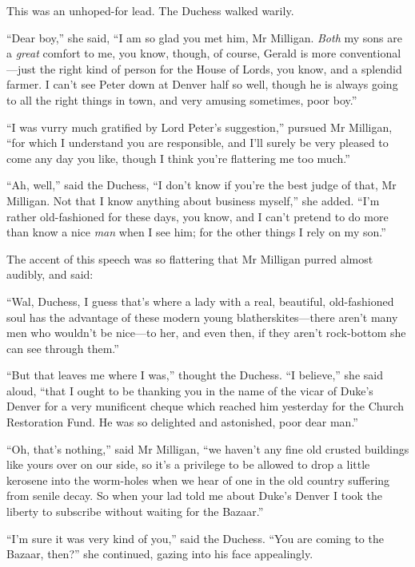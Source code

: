 This was an unhoped-for lead. The Duchess walked warily.

\enquote{Dear boy,} she said, \enquote{I am so glad you met him, Mr Milligan. \textit{Both} my sons are a \textit{great} comfort to me, you know, though, of course, Gerald is more conventional\allowbreak---\allowbreak just the right kind of person for the House of Lords, you know, and a splendid farmer. I can’t see Peter down at Denver half so well, though he is always going to all the right things in town, and very amusing sometimes, poor boy.}

\enquote{I was vurry much gratified by Lord Peter’s suggestion,} pursued Mr Milligan, \enquote{for which I understand you are responsible, and I’ll surely be very pleased to come any day you like, though I think you’re flattering me too much.}

\enquote{Ah, well,} said the Duchess, \enquote{I don’t know if you’re the best judge of that, Mr Milligan. Not that I know anything about business myself,} she added. \enquote{I’m rather old-fashioned for these days, you know, and I can’t pretend to do more than know a nice \textit{man} when I see him; for the other things I rely on my son.}

The accent of this speech was so flattering that Mr Milligan purred almost audibly, and said:

\enquote{Wal, Duchess, I guess that’s where a lady with a real, beautiful, old-fashioned soul has the advantage of these modern young blatherskites\allowbreak---\allowbreak there aren’t many men who wouldn’t be nice\allowbreak---\allowbreak to her, and even then, if they aren’t rock-bottom she can see through them.}

\enquote{But that leaves me where I was,} thought the Duchess. \enquote{I believe,} she said aloud, \enquote{that I ought to be thanking you in the name of the vicar of Duke’s Denver for a very munificent cheque which reached him yesterday for the Church Restoration Fund. He was so delighted and astonished, poor dear man.}

\enquote{Oh, that’s nothing,} said Mr Milligan, \enquote{we haven’t any fine old crusted buildings like yours over on our side, so it’s a privilege to be allowed to drop a little kerosene into the worm-holes when we hear of one in the old country suffering from senile decay. So when your lad told me about Duke’s Denver I took the liberty to subscribe without waiting for the Bazaar.}

\enquote{I’m sure it was very kind of you,} said the Duchess. \enquote{You are coming to the Bazaar, then?} she continued, gazing into his face appealingly.

